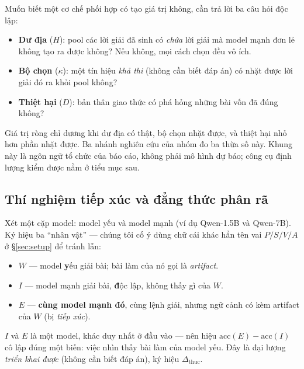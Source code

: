 \documentclass[11pt,a4paper]{article}
\newcommand{\dhonest}{\Delta_{\mathrm{thuc}}}
\newcommand{\acc}{\mathrm{acc}}
\begin{document}
Muốn biết một cơ chế phối hợp có tạo giá trị không, cần trả lời ba câu hỏi độc lập:
\begin{itemize}\itemsep1pt
  \item \textbf{Dư địa} ($H$): pool các lời giải đã sinh có \emph{chứa} lời giải mà model mạnh
        đơn lẻ không tạo ra được không? Nếu không, mọi cách chọn đều vô ích.
  \item \textbf{Bộ chọn} ($\kappa$): một tín hiệu \emph{khả thi} (không cần biết đáp án) có
        nhặt được lời giải đó ra khỏi pool không?
  \item \textbf{Thiệt hại} ($D$): bản thân giao thức có phá hỏng những bài vốn đã đúng không?
\end{itemize}
Giá trị ròng chỉ dương khi dư địa có thật, bộ chọn nhặt được, và thiệt hại nhỏ hơn phần nhặt
được. Ba nhánh nghiên cứu của nhóm đo ba thừa số này. Khung này là ngôn ngữ tổ chức của báo
cáo, không phải mô hình dự báo; công cụ định lượng kiểm được nằm ở tiểu mục sau.

\subsection{Thí nghiệm tiếp xúc và đẳng thức phân rã}\label{sec:identity}

Xét một cặp model: model yếu và model mạnh (ví dụ Qwen-1.5B và Qwen-7B). Ký hiệu ba ``nhân
vật'' --- chúng tôi cố ý dùng chữ cái khác hẳn tên vai $P/S/V/A$ ở \S\ref{sec:setup} để tránh
lẫn:
\begin{itemize}\itemsep1pt
  \item $W$ --- model \textbf{y}ếu giải bài; bài làm của nó gọi là \emph{artifact}.
  \item $I$ --- model mạnh giải bài, \textbf{đ}ộc lập, không thấy gì của $W$.
  \item $E$ --- \textbf{cùng model mạnh đó}, cùng lệnh giải, nhưng ngữ cảnh có kèm artifact
        của $W$ (bị \emph{tiếp xúc}).
\end{itemize}
$I$ và $E$ là một model, khác duy nhất ở đầu vào --- nên hiệu $\acc(E)-\acc(I)$ cô lập đúng một
biến: việc nhìn thấy bài làm của model yếu. Đây là đại lượng \emph{triển khai được} (không cần
biết đáp án), ký hiệu $\dhonest$.
\end{document}
